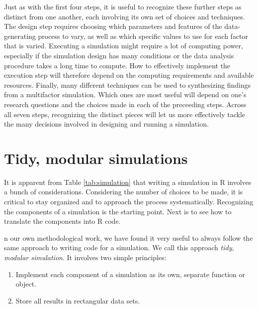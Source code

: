 \documentclass[
]{book}
\providecommand{\tightlist}{%
  \setlength{\itemsep}{0pt}\setlength{\parskip}{0pt}}
\begin{document}
Just as with the first four steps, it is useful to recognize these further steps as distinct from one another, each involving its own set of choices and techniques.
The design step requires choosing which parameters and features of the data-generating process to vary, as well as which specific values to use for each factor that is varied.
Executing a simulation might require a lot of computing power, especially if the simulation design has many conditions or the data analysis procedure takes a long time to compute.
How to effectively implement the execution step will therefore depend on the computing requirements and available resources.
Finally, many different techniques can be used to synthesizing findings from a multifactor simulation.
Which ones are most useful will depend on one's research questions and the choices made in each of the preceeding steps.
Across all seven steps, recognizing the distinct pieces will let us more effectively tackle the many decisions involved in designing and running a simulation.

\section{Tidy, modular simulations}\label{tidy-modular-simulations}

It is apparent from Table \ref{tab:simulation} that writing a simulation in R involves a bunch of considerations.
Considering the number of choices to be made, it is critical to stay organized and to approach the process systematically.
Recognizing the components of a simulation is the starting point.
Next is to see how to translate the components into R code.

n our own methodological work, we have found it very useful to always follow the same approach to writing code for a simulation.
We call this approach \emph{tidy, modular simulation}. It involves two simple principles:

\begin{enumerate}
\def\labelenumi{\arabic{enumi}.}
\tightlist
\item
  Implement each component of a simulation as its own, separate function or object.
\item
  Store all results in rectangular data sets.
\end{enumerate}
\end{document}
